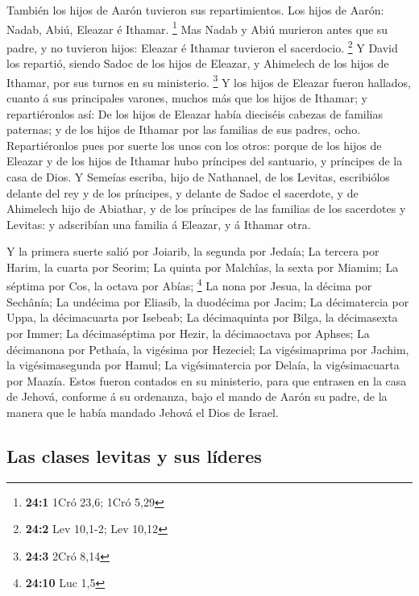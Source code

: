  También los hijos de Aarón tuvieron sus repartimientos.
Los hijos de Aarón: Nadab, Abiú, Eleazar é Ithamar. \footnote{\textbf{24:1}
  1Cró 23,6; 1Cró 5,29}  Mas Nadab y Abiú murieron antes
que su padre, y no tuvieron hijos: Eleazar é Ithamar tuvieron el
sacerdocio. \footnote{\textbf{24:2} Lev 10,1-2; Lev 10,12}
 Y David los repartió, siendo Sadoc de los hijos de
Eleazar, y Ahimelech de los hijos de Ithamar, por sus turnos en su
ministerio. \footnote{\textbf{24:3} 2Cró 8,14}  Y los
hijos de Eleazar fueron hallados, cuanto á sus principales varones,
muchos más que los hijos de Ithamar; y repartiéronlos así: De los hijos
de Eleazar había dieciséis cabezas de familias paternas; y de los hijos
de Ithamar por las familias de sus padres, ocho. 
Repartiéronlos pues por suerte los unos con los otros: porque de los
hijos de Eleazar y de los hijos de Ithamar hubo príncipes del santuario,
y príncipes de la casa de Dios.  Y Semeías escriba, hijo
de Nathanael, de los Levitas, escribiólos delante del rey y de los
príncipes, y delante de Sadoc el sacerdote, y de Ahimelech hijo de
Abiathar, y de los príncipes de las familias de los sacerdotes y
Levitas: y adscribían una familia á Eleazar, y á Ithamar otra.

 Y la primera suerte salió por Joiarib, la segunda por
Jedaía;  La tercera por Harim, la cuarta por Seorim;
 La quinta por Malchîas, la sexta por Miamim;
 La séptima por Cos, la octava por Abías; \footnote{\textbf{24:10}
  Luc 1,5}  La nona por Jesua, la décima por Sechânía;
 La undécima por Eliasib, la duodécima por Jacim;
 La décimatercia por Uppa, la décimacuarta por Isebeab;
 La décimaquinta por Bilga, la décimasexta por Immer;
 La décimaséptima por Hezir, la décimaoctava por Aphses;
 La décimanona por Pethaía, la vigésima por Hezeciel;
 La vigésimaprima por Jachim, la vigésimasegunda por
Hamul;  La vigésimatercia por Delaía, la vigésimacuarta
por Maazía.  Estos fueron contados en su ministerio, para
que entrasen en la casa de Jehová, conforme á su ordenanza, bajo el
mando de Aarón su padre, de la manera que le había mandado Jehová el
Dios de Israel.

\hypertarget{las-clases-levitas-y-sus-luxedderes}{%
\subsection{Las clases levitas y sus
líderes}\label{las-clases-levitas-y-sus-luxedderes}}


